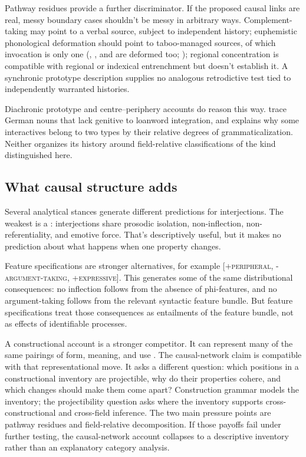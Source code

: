 \documentclass[12pt]{article}
\begin{document}
Pathway residues provide a further discriminator. If the proposed causal
links are real, messy boundary cases shouldn't be messy in arbitrary
ways. Complement-taking may point to a verbal source, subject to independent
history; euphemistic phonological deformation should point to taboo-managed
sources, of which invocation is only one (, ,
and  are deformed too; \citealp[306]{heine2023interactives});
regional concentration is compatible with regional or indexical entrenchment
but doesn't establish it. A synchronic prototype description supplies no
analogous retrodictive test tied to independently warranted histories.

Diachronic prototype and centre--periphery accounts do reason this way.
\textcite[8]{zimmerackermann2025} trace German nouns that lack genitive
 to loanword integration, and \textcite[48]{heine2023interactives}
explains why some interactives belong to two types by their relative degrees
of grammaticalization. Neither organizes its history around field-relative
classifications of the kind distinguished here.

\subsection{What causal structure adds}

Several analytical stances generate different predictions for
interjections. The weakest is a : interjections share
prosodic isolation, non-inflection, non-referentiality, and emotive
force. That's descriptively useful, but it makes no prediction about
what happens when one property changes.

Feature specifications are stronger alternatives, for example
[\textsc{+peripheral}, \textsc{-argument-taking},
\textsc{+expressive}]. This generates some of the same distributional
consequences: no inflection follows from the absence of phi-features,
and no argument-taking follows from the relevant syntactic feature
bundle. But feature specifications treat those consequences as
entailments of the feature bundle, not as effects of identifiable
processes.

A constructional account is a stronger competitor. It can represent
many of the same pairings of form, meaning, and use
\citep{goldberg1995constructions,goldberg2006,croft2001}. The
causal-network claim is compatible with that representational move. It
asks a different question: which positions in a constructional inventory
are projectible, why do their properties cohere, and which changes
should make them come apart? Construction grammar models the inventory;
the projectibility question asks where the inventory supports
cross-constructional and cross-field inference. The two main pressure
points are pathway residues and field-relative decomposition. If those
payoffs fail under further testing, the causal-network account collapses
to a descriptive inventory rather than an explanatory category analysis.
\end{document}
